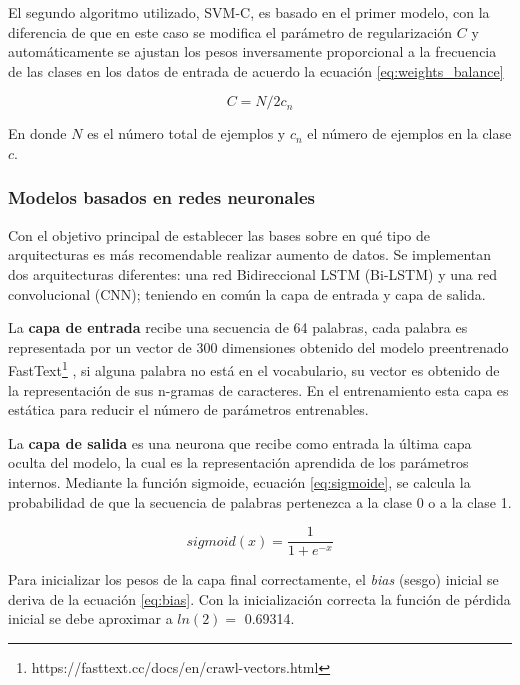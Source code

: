  El segundo algoritmo utilizado, SVM-C,  es basado en el primer modelo, con la diferencia de que en este caso se modifica el parámetro de regularización $C$ y automáticamente se ajustan los pesos inversamente proporcional a la frecuencia de las clases en los datos de entrada de acuerdo la ecuación \ref{eq:weights_balance}
 
 \begin{equation}
 \label{eq:weights_balance}
     C = N/2c_n
 \end{equation}
 
 En donde $N$ es el número total de ejemplos y $c_n$ el número de ejemplos en la clase $c$.  

\subsubsection{Modelos basados en redes neuronales}

Con el objetivo principal de establecer las bases sobre en qué tipo de arquitecturas es más recomendable realizar aumento de datos. Se implementan dos arquitecturas diferentes: una red Bidireccional LSTM (Bi-LSTM) y una red convolucional (CNN); teniendo en común la capa de entrada y capa de salida.

La \textbf{capa de entrada} recibe una secuencia de 64 palabras, cada palabra es representada por un vector de 300 dimensiones obtenido del modelo preentrenado FastText\footnote{https://fasttext.cc/docs/en/crawl-vectors.html} , si alguna palabra no está en el vocabulario, su vector es obtenido de la representación de sus n-gramas de caracteres. En el entrenamiento esta capa es estática para reducir el número de parámetros entrenables.

La \textbf{capa de salida} es una neurona que recibe como entrada la última capa oculta del modelo, la cual es la representación aprendida de los parámetros internos. Mediante la función sigmoide, ecuación \ref{eq:sigmoide}, se calcula la probabilidad de que la secuencia de palabras pertenezca a la clase 0 o a la clase 1.

\begin{equation}
    \label{eq:sigmoide}
    sigmoid(x) = \frac{1}{1+ e^{-x}}
\end{equation}

Para inicializar los pesos de la capa final correctamente, el \textit{bias} (sesgo) inicial se deriva de la ecuación \ref{eq:bias}. Con la inicialización correcta la función de pérdida inicial se debe aproximar a $ln(2)=$ 0.69314. 

